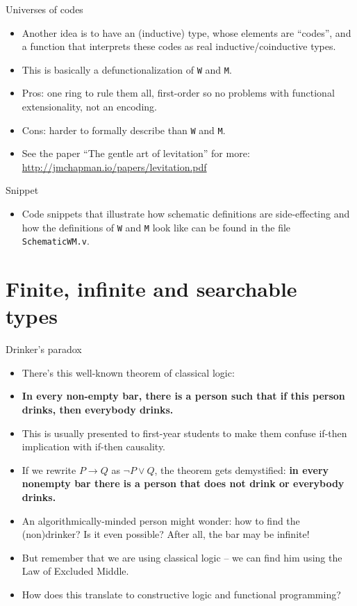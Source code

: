 \documentclass{beamer}
\begin{document}
\begin{frame}{Universes of codes}
\begin{itemize}
	\item Another idea is to have an (inductive) type, whose elements are ``codes'', and a function that interprets these codes as real inductive/coinductive types.
	\item This is basically a defunctionalization of \texttt{W} and \texttt{M}.
	\item Pros: one ring to rule them all, first-order so no problems with functional extensionality, not an encoding.
	\item Cons: harder to formally describe than \texttt{W} and \texttt{M}.
	\item See the paper ``The gentle art of levitation'' for more: \url{http://jmchapman.io/papers/levitation.pdf}
\end{itemize}
\end{frame}

\begin{frame}{Snippet}
\begin{itemize}
	\item Code snippets that illustrate how schematic definitions are side-effecting and how the definitions of \texttt{W} and \texttt{M} look like can be found in the file \texttt{SchematicWM.v}.
\end{itemize}
\end{frame}

\section{Finite, infinite and searchable types}

\begin{frame}{Drinker's paradox}
\begin{itemize}
	\item There's this well-known theorem of classical logic:
	\item \textbf{In every non-empty bar, there is a person such that if this person drinks, then everybody drinks.}
	\item This is usually presented to first-year students to make them confuse if-then implication with if-then causality.
	\item If we rewrite $P \to Q$ as $\neg P \lor Q$, the theorem gets demystified: \textbf{in every nonempty bar there is a person that does not drink or everybody drinks.}
	\item An algorithmically-minded person might wonder: how to find the (non)drinker? Is it even possible? After all, the bar may be infinite!
	\item But remember that we are using classical logic -- we can find him using the Law of Excluded Middle.
	\item How does this translate to constructive logic and functional programming?
\end{itemize}
\end{frame}
\end{document}
